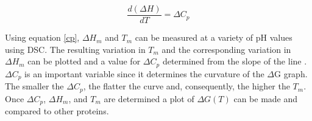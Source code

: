 \begin{equation}\label{cp}
\frac{ d \left ( \Delta H \right ) }{ dT }  = \Delta {C}_{p}
\end{equation}

Using equation \eqref{cp}, $\Delta{H}_{m}$ and ${T}_{m}$ can be measured at a
variety of pH values using DSC.  The resulting variation in ${T}_{m}$ and the
corresponding variation in $\Delta{H}_{m}$ can be plotted and a value for
$\Delta{C}_{p}$ determined from the slope of the line \cite{privalov1979sps}.
$\Delta  {C }_{p }$ is an important variable since it determines the curvature
of the $\Delta$G graph.  The smaller the $\Delta{C}_{p}$, the flatter the curve
and, consequently, the higher the ${T}_{m}$. Once $\Delta{C}_{p}$,
$\Delta{H}_{m}$, and ${T}_{m}$ are determined a plot of $\Delta G \left (  T
\right )$ can be made and compared to other proteins.






